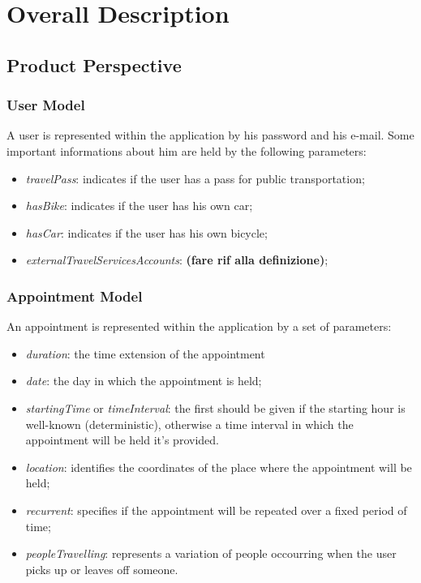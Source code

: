 \chapter{Overall Description}

\section{Product Perspective}

\subsection{User Model} \label{subsect:usermodel}
A user is represented within the application by his password and his e-mail. 
Some important informations about him are held by the following parameters:
\begin{itemize}
\item \textit{travelPass}: indicates if the user has a pass for public transportation;
\item \textit{hasBike}: indicates if the user has his own car;
\item \textit{hasCar}: indicates if the user has his own bicycle;
\item \textit{externalTravelServicesAccounts}: \textbf{(fare rif alla definizione)};
\end{itemize}

\subsection{Appointment Model} \label{subsect:appointmentmodel}
An appointment is represented within the application by a set of parameters:
\begin{itemize}
\item \textit{duration}: the time extension of the appointment
\item \textit{date}: the day in which the appointment is held;
\item \textit{startingTime} or \textit{timeInterval}: the first should be given if the starting hour is well-known (deterministic), otherwise a time interval in which the appointment will be held it's provided. 
\item \textit{location}: identifies the coordinates of the place where the appointment will be held;
\item \textit{recurrent}: specifies if the appointment will be repeated over a fixed period of time;
\item \textit{peopleTravelling}: represents a variation of people occourring when the user picks up or leaves off someone.
\end{itemize}

